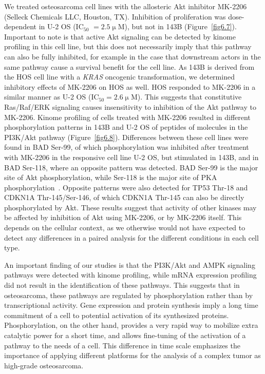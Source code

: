 We treated osteosarcoma cell lines with the allosteric Akt inhibitor MK-2206 (Selleck Chemicals LLC, Houston, TX). Inhibition of proliferation was dose\hyp{}dependent in U-2 OS (IC$_{50}$ $=2.5\upmu$M), but not in 143B (Figure~\ref{fig6.7}). Important to note is that active Akt signaling can be detected by kinome profiling in this cell line, but this does not necessarily imply that this pathway can also be fully inhibited, for example in the case that downstream actors in the same pathway cause a survival benefit for the cell line. As 143B is derived from the HOS cell line with a {\it KRAS} oncogenic transformation, we determined inhibitory effects of MK-2206 on HOS as well. HOS responded to MK-2206 in a similar manner as U-2 OS (IC$_{50}=2.6\upmu$M). This suggests that constitutive Ras/Raf/ERK signaling causes insensitivity to inhibition of the Akt pathway to MK-2206. Kinome profiling of cells treated with MK-2206 resulted in different phosphorylation patterns in 143B and U-2 OS of peptides of molecules in the PI3K/Akt pathway (Figure~\ref{fig6.8}). Differences between these cell lines were found in BAD Ser-99, of which phosphorylation was inhibited after treatment with MK-2206 in the responsive cell line U-2 OS, but stimulated in 143B, and in BAD Ser-118, where an opposite pattern was detected. BAD Ser-99 is the major site of Akt phosphorylation, while Ser-118 is the major site of PKA phosphorylation~\cite{hornbeck2004phosphosite}. Opposite patterns were also detected for TP53 Thr-18 and CDKN1A Thr-145/Ser-146, of which CDKN1A Thr-145 can also be directly phosphorylated by Akt. These results suggest that activity of other kinases may be affected by inhibition of Akt using MK-2206, or by MK-2206 itself. This depends on the cellular context, as we otherwise would not have expected to detect any differences in a paired analysis for the different conditions in each cell type.

An important finding of our studies is that the PI3K/Akt and AMPK signaling pathways were detected with kinome profiling, while mRNA expression profiling did not result in the identification of these pathways. This suggests that in osteosarcoma, these pathways are regulated by phosphorylation rather than by transcriptional activity. Gene expression and protein synthesis imply a long time commitment of a cell to potential activation of its synthesized proteins. Phosphorylation, on the other hand, provides a very rapid way to mobilize extra catalytic power for a short time, and allows fine\hyp{}tuning of the activation of a pathway to the needs of a cell. This difference in time scale emphasizes the importance of applying different platforms for the analysis of a complex tumor as high\hyp{}grade osteosarcoma.

